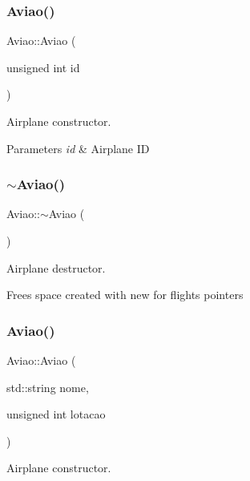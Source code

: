 \subsubsection{\texorpdfstring{Aviao()}{Aviao()}\hspace{0.1cm}{\footnotesize\ttfamily [1/4]}}
{\footnotesize\ttfamily Aviao\+::\+Aviao (\begin{DoxyParamCaption}\item[{unsigned int}]{id }\end{DoxyParamCaption})}



Airplane constructor. 


\begin{DoxyParams}{Parameters}
{\em id} & Airplane ID \\
\hline
\end{DoxyParams}
\mbox{\label{class_aviao_a04157e09c8c20e6596cea3abbd57d415}} 
\subsubsection{\texorpdfstring{$\sim$\+Aviao()}{~Aviao()}}
{\footnotesize\ttfamily Aviao\+::$\sim$\+Aviao (\begin{DoxyParamCaption}{ }\end{DoxyParamCaption})}



Airplane destructor. 

Frees space created with new for flights pointers \mbox{\label{class_aviao_a17c48595d427e93b351556d8cec01423}} 
\subsubsection{\texorpdfstring{Aviao()}{Aviao()}\hspace{0.1cm}{\footnotesize\ttfamily [2/4]}}
{\footnotesize\ttfamily Aviao\+::\+Aviao (\begin{DoxyParamCaption}\item[{std\+::string}]{nome,  }\item[{unsigned int}]{lotacao }\end{DoxyParamCaption})}



Airplane constructor. 


